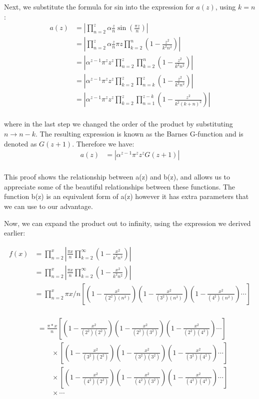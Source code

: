\documentclass{article}
\begin{document}
Next, we substitute the formula for sin into the expression for $a(z)$, using $k=n$:
\begin{align*}
a(z) &= \left|\prod_{n=2}^z \alpha\frac{z}{n}\sin\left(\frac{\pi z}{n}\right)\right| \\
&= \left|\prod_{n=2}^z \alpha\frac{z}{n} \pi z\prod_{k=2}^n \left(1-\frac{z^2}{k^2n^2}\right)\right| \\
&= \left|\alpha^{z-1}\pi^z z^z \prod_{n=2}^z\prod_{k=2}^n \left(1-\frac{z^2}{k^2n^2}\right)\right| \\
&= \left|\alpha^{z-1}\pi^z z^z \prod_{k=2}^z\prod_{n=k}^z \left(1-\frac{z^2}{k^2n^2}\right)\right| \\
&= \left|\alpha^{z-1}\pi^z z^z \prod_{k=2}^z\prod_{n=1}^{z-k} \left(1-\frac{z^2}{k^2(k+n)^2}\right)\right| \\
\end{align*}

where in the last step we changed the order of the product by substituting $n\rightarrow n-k$. The resulting expression is known as the Barnes G-function and is denoted as $G(z+1)$. Therefore we have:
\begin{align*}
a(z) &= \left|\alpha^{z-1}\pi^z z^z G(z+1)\right| \\
\end{align*}

This proof shows the relationship between a(z) and b(z), and allows us to appreciate some of the beautiful relationships between these functions. The function b(z) is an equivalent form of a(z) however it has extra parameters that we can use to our advantage.

Now, we can expand the product out to infinity, using the expression we derived earlier:

\begin{align*}
f(x) &= \prod_{n=2}^{x} \left|\frac{\pi x}{n} \prod_{k=2}^{\infty} \left( 1 - \frac{x^2}{k^2 n^2} \right) \right| \\
&= \prod_{n=2}^{x} \left|\frac{\pi x}{n} \prod_{k=2}^{\infty} \left( 1 - \frac{x^2}{k^2 n^2} \right) \right| \\
&= \prod_{n=2}^{x} \pi x/n \left[ \left( 1 - \frac{x^2}{(2^2)(n^2)}\right) \left( 1 - \frac{x^2}{(3^2)(n^2)}\right) \left( 1 - \frac{x^2}{(4^2)(n^2)}\right) \cdots \right] \\
\end{align*}

\begin{align*}
&= \frac{\pi*x}{n}\left[ \left( 1 - \frac{x^2}{(2^2)(2^2)}\right) \left( 1 - \frac{x^2}{(2^2)(3^2)}\right) \left( 1 - \frac{x^2}{(2^2)(4^2)}\right) \cdots \right] \\
&\qquad \times \left[ \left( 1 - \frac{x^2}{(3^2)(2^2)}\right) \left( 1 - \frac{x^2}{(3^2)(3^2)}\right) \left( 1 - \frac{x^2}{(3^2)(4^2)}\right) \cdots \right] \\
&\qquad \times \left[ \left( 1 - \frac{x^2}{(4^2)(2^2)}\right) \left( 1 - \frac{x^2}{(4^2)(3^2)}\right) \left( 1 - \frac{x^2}{(4^2)(4^2)}\right) \cdots \right] \\
&\qquad \times \cdots \\
\end{align*}
\end{document}
